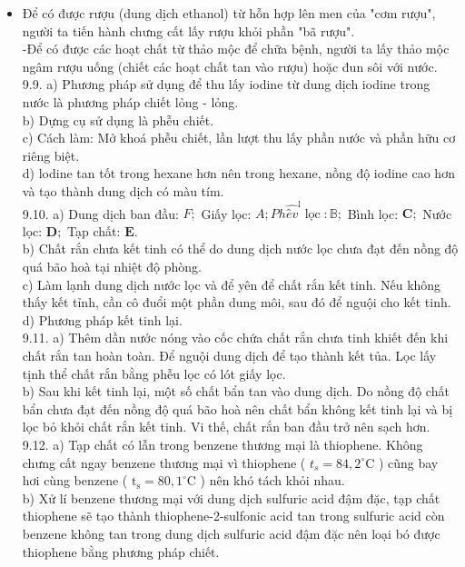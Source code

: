 \documentclass[10pt]{article}
\begin{document}
\begin{itemize}
  \item Để có được rượu (dung dịch ethanol) từ hỗn hợp lên men của "cơm rượu", người ta tiến hành chưng cất lấy rượu khỏi phần "bã rượu".\\
-Để có được các hoạt chất từ thảo mộc để chữa bệnh, người ta lấy thảo mộc ngâm rượu uống (chiết các hoạt chất tan vào rượu) hoặc đun sôi với nước.\\
9.9. a) Phương pháp sử dụng để thu lấy iodine từ dung dịch iodine trong nước là phương pháp chiết lỏng - lỏng.\\
b) Dựng cụ sử dụng là phễu chiết.\\
c) Cách làm: Mở khoá phễu chiết, lần lượt thu lấy phần nước và phần hữu cơ riêng biệt.\\
d) lodine tan tốt trong hexane hơn nên trong hexane, nồng độ iodine cao hơn và tạo thành dung dịch có màu tím.\\
9.10. a) Dung dịch ban đầu: $F ;$ Giấy lọc: $A ; P h \hat{e ̂ v}^{\mathrm{l}} \operatorname{lọc}: \mathbb{B} ;$ Bình lọc: $\mathbf{C} ;$ Nước lọc: $\mathbf{D} ;$ Tạp chất: $\mathbf{E}$.\\
b) Chất rắn chưa kết tinh có thể do dung dịch nước lọc chưa đạt đến nồng độ quá bão hoà tại nhiệt độ phòng.\\
c) Làm lạnh dung dịch nước lọc và để yên để chất rắn kết tinh. Nếu không thấy kết tỉnh, cần cô đuổi một phần dung môi, sau đó để nguội cho kết tinh.\\
d) Phương pháp kết tinh lại.\\
9.11. a) Thêm dần nước nóng vào cốc chứa chất rắn chưa tinh khiết đến khi chất rắn tan hoàn toàn. Để nguội dung dịch để tạo thành kết tủa. Lọc lấy tịnh thể chất rắn bằng phễu lọc có lót giấy lọc.\\
b) Sau khi kết tinh lại, một số chất bẩn tan vào dung dịch. Do nồng độ chất bẩn chưa đạt đến nồng độ quá bão hoà nên chất bẩn không kết tinh lại và bị lọc bỏ khỏi chất rắn kết tinh. Vi thế, chất rắn ban đầu trở nên sạch hơn.\\
9.12. a) Tạp chất có lẫn trong benzene thương mại là thiophene. Không chưng cất ngay benzene thương mại vì thiophene ( $t_{s}=84,2^{\circ} \mathrm{C}$ ) cũng bay hơi cùng benzene ( $\mathrm{t}_{\mathrm{s}}=80,1^{\circ} \mathrm{C}$ ) nên khó tách khỏi nhau.\\
b) Xử lí benzene thương mại với dung dịch sulfuric acid đậm đặc, tạp chất thiophene sẽ tạo thành thiophene-2-sulfonic acid tan trong sulfuric acid còn benzene không tan trong dung dịch sulfuric acid đậm đặc nên loại bó được thiophene bằng phương pháp chiết.\\

\end{itemize}
\end{document}
